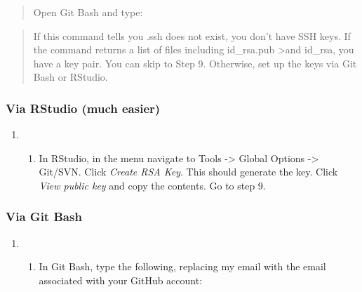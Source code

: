 \documentclass[12pt,]{article}
\providecommand{\tightlist}{%
  \setlength{\itemsep}{0pt}\setlength{\parskip}{0pt}}
\begin{document}
\begin{quote}
Open Git Bash and type:
\end{quote}

\begin{quote}
\colorbox{light-gray}{}
\end{quote}

\begin{quote}
If this command tells you .ssh does not exist, you don't have SSH keys.
If the command returns a list of files including id\_rsa.pub
\textgreater{}and id\_rsa, you have a key pair. You can skip to Step 9.
Otherwise, set up the keys via Git Bash or RStudio.
\end{quote}

\subsubsection{Via RStudio (much easier)}\label{via-rstudio-much-easier}

\begin{enumerate}
\def\labelenumi{\arabic{enumi}.}
\setcounter{enumi}{5}
\item
  \begin{enumerate}
  \def\labelenumii{\alph{enumii}.}
  \tightlist
  \item
    In RStudio, in the menu navigate to Tools -\textgreater{} Global
    Options -\textgreater{} Git/SVN. Click \emph{Create RSA Key}. This
    should generate the key. Click \emph{View public key} and copy the
    contents. Go to step 9.
  \end{enumerate}
\end{enumerate}

\subsubsection{Via Git Bash}\label{via-git-bash}

\begin{enumerate}
\def\labelenumi{\arabic{enumi}.}
\setcounter{enumi}{5}
\item
  \begin{enumerate}
  \def\labelenumii{\alph{enumii}.}
  \setcounter{enumii}{1}
  \tightlist
  \item
    In Git Bash, type the following, replacing my email with the email
    associated with your GitHub account:
  \end{enumerate}
\end{enumerate}
\end{document}
